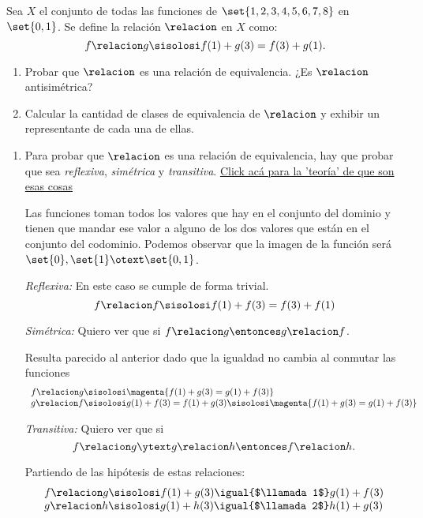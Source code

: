 \begin{enunciado}{\ejExtra}
	Sea $X$ el conjunto de todas las funciones de $\set{1,2,3,4,5,6,7,8}$ en $\set{0,1}$. Se define la relación $\relacion$ en $X$ como:
	$$
		f \relacion g \sisolosi f(1) + g(3) = f(3) + g(1).
	$$
	\begin{enumerate}[label=\alph*)]
		\item Probar que $\relacion$ es una relación de equivalencia. ¿Es $\relacion$ antisimétrica?
		\item Calcular la cantidad de clases de equivalencia de $\relacion$ y exhibir un representante de cada una de ellas.
	\end{enumerate}
\end{enunciado}

\begin{enumerate}[label=\alph*)]
	\item
	      Para probar que $\relacion$ es una relación de equivalencia, hay que probar que sea \textit{reflexiva}, \textit{simétrica} y \textit{transitiva}.
	      \hyperlink{teoria-1:prop-relaciones}{Click acá para la 'teoría' de que son esas cosas}\par

	      \bigskip

	      Las funciones toman todos los valores que hay en el conjunto del dominio y tienen que mandar ese valor a alguno de los dos valores que están
	      en el conjunto del codominio. Podemos observar que la imagen de la función será $\set{0}, \set{1} \otext \set{0,1}$.

	      \textit{Reflexiva:} En este caso se cumple de forma trivial.
	      $$
		      f \relacion f \sisolosi f(1) + f(3) = f(3) + f(1)
	      $$


	      \textit{Simétrica:}
	      Quiero ver que si $f \relacion g \entonces g \relacion f$.\par Resulta parecido al anterior dado que la igualdad no cambia al conmutar las funciones
	      $$
		      \begin{array}{l}
			      f \relacion g \sisolosi \magenta{f(1) + g(3) = g(1) + f(3)} \\
			      g \relacion f \sisolosi g(1) + f(3) = f(1) + g(3) \sisolosi \magenta{f(1) + g(3) = g(1) + f(3)}
		      \end{array}
	      $$


	      \textit{Transitiva:}
	      Quiero ver que si
	      $$f \relacion g \ytext g \relacion h \entonces f \relacion h.$$

	      Partiendo de las hipótesis de estas relaciones:
	      $$
		      \begin{array}{l}
			      f \relacion g \sisolosi f(1) + g(3) \igual{$\llamada1$} g(1) + f(3) \\
			      g \relacion h \sisolosi g(1) + h(3) \igual{$\llamada2$} h(1) + g(3) \\
		      \end{array}
	      $$


\end{enumerate}
